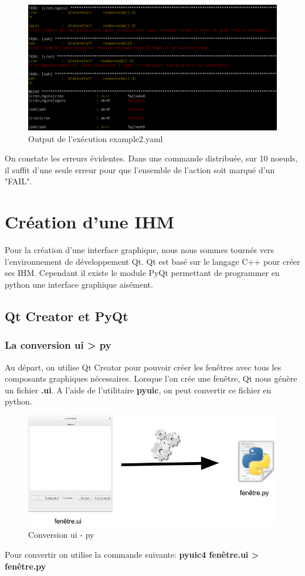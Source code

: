 \documentclass[a4paper,11pt]{article}
\begin{document}
\begin{figure}[H]
		\centerline{\includegraphics[scale=0.4]{resultat2_yaml.png}}
		\caption{Output de l'exécution example2.yaml}
\end{figure}
\noindent
On constate les erreurs évidentes. Dans une commande distribuée, sur 10 noeuds, il suffit d'une seule erreur pour que l'ensemble de l'action soit marqué d'un "FAIL".

\pagebreak

\section{Création d'une IHM}
\label{sec:section5}
Pour la création d'une interface graphique, nous nous sommes tournés vers l'environnement de développement Qt. Qt est basé sur le langage C++ pour créer ses IHM. Cependant il existe le module PyQt permettant de programmer en python une interface graphique aisément.
\subsection{Qt Creator et PyQt}
\subsubsection{La conversion ui > py}
Au départ, on utilise Qt Creator pour pouvoir créer les fenêtres avec tous les composants graphiques nécessaires. Lorsque l'on crée une fenêtre, Qt nous génère un fichier \textbf{.ui}. A l'aide de l'utilitaire \textbf{pyuic}, on peut convertir ce fichier en python.
\begin{figure}[hbtp]
\centering
\includegraphics[scale=0.3]{conversion_ui_py.jpg}
\caption{Conversion ui - py}
\end{figure}
Pour convertir on utilise la commande suivante: \textbf{pyuic4 fenêtre.ui > fenêtre.py}\linebreak
\\
\end{document}
